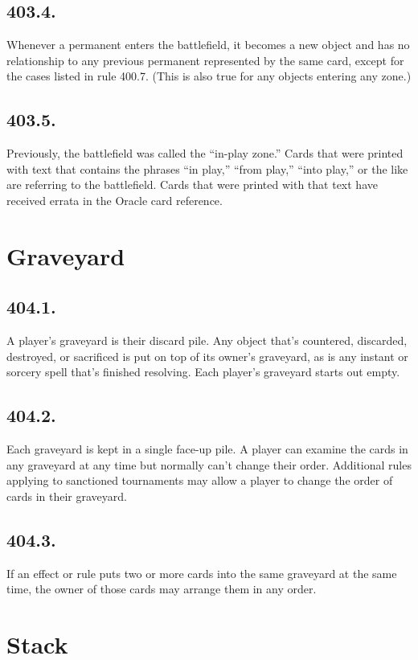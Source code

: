 \subsection*{403.4.}
Whenever a permanent enters the battlefield, it becomes a new object and has no relationship to any previous permanent represented by the same card, except for the cases listed in rule 400.7. (This is also true for any objects entering any zone.)

\subsection*{403.5.}
Previously, the battlefield was called the “in-play zone.” Cards that were printed with text that contains the phrases “in play,” “from play,” “into play,” or the like are referring to the battlefield. Cards that were printed with that text have received errata in the Oracle card reference.

\section{Graveyard}
\subsection*{404.1.}
A player’s graveyard is their discard pile. Any object that’s countered, discarded, destroyed, or sacrificed is put on top of its owner’s graveyard, as is any instant or sorcery spell that’s finished resolving. Each player’s graveyard starts out empty.

\subsection*{404.2.}
Each graveyard is kept in a single face-up pile. A player can examine the cards in any graveyard at any time but normally can’t change their order. Additional rules applying to sanctioned tournaments may allow a player to change the order of cards in their graveyard.

\subsection*{404.3.}
If an effect or rule puts two or more cards into the same graveyard at the same time, the owner of those cards may arrange them in any order.

\section{Stack}
